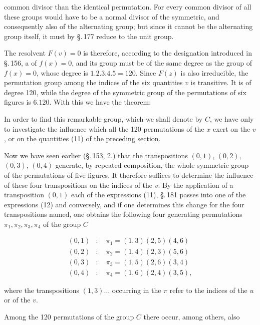 common divisor than the identical permutation. For every common divisor of all these groups would have to be a normal divisor of the symmetric, and consequently also of the alternating group; but since it cannot be the alternating group itself, it must by \S.\,177 reduce to the unit group.

The resolvent $F(v) = 0$ is therefore, according to the designation introduced in \S.\,156, a  of $f(x) = 0$, and its group must be of the same degree as the group of $f(x) = 0$, whose degree is $1 . 2 . 3 . 4 . 5 = 120$. Since $F(z)$ is also irreducible, the permutation group among the indices of the six quantities $v$ is transitive. It is of degree 120, while the degree of the symmetric group of the permutations of six figures is $6 . 120$. With this we have the theorem:


In order to find this remarkable group, which we shall denote by $C$, we have only to investigate the influence which all the 120 permutations of the $x$ exert on the $v$, or on the quantities (11) of the preceding section.

Now we have seen earlier (\S.\,153, 2.) that the transpositions $(0, 1)$, $(0, 2)$, $(0, 3)$, $(0, 4)$ generate, by repeated composition, the whole symmetric group of the permutations of five figures. It therefore suffices to determine the influence of these four transpositions on the indices of the $v$. By the application of a transposition $(0, 1)$ each of the expressions (11), \S.\,181 passes into one of the expressions (12) and conversely, and if one determines this change for the four transpositions named, one obtains the following four generating permutations $\pi_1, \pi_2, \pi_3, \pi_4$ of the group $C$

\[
\begin{aligned}
(0, 1)&: \quad \pi_1 = (1, 3) (2, 5) (4, 6) \\
(0, 2)&: \quad \pi_2 = (1, 4) (2, 3) (5, 6) \\
(0, 3)&: \quad \pi_3 = (1, 5) (2, 6) (3, 4) \\
(0, 4)&: \quad \pi_4 = (1, 6) (2, 4) (3, 5),
\end{aligned}
\]

where the transpositions $(1, 3) \ldots$ occurring in the $\pi$ refer to the indices of the $u$ or of the $v$.

Among the 120 permutations of the group $C$ there occur, among others, also
